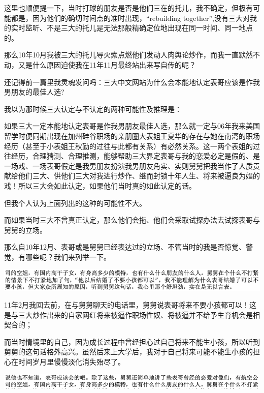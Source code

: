 \documentclass[9pt, b5paper]{article}
\begin{document}
这里也顺便提一下，当时打球的朋友是否是他们三在的托儿，我不确定，但极有可能都是，因为他们的确切时间点的准时出现，“rebuilding together”,没有三大对我的实时监听、不是三大的托儿是无法那般精确定位地出现在同一时间、同一地点的。 

那么10年10月我被三大的托儿导火索点燃他们发动人肉舆论炒作，而我一直默然不动，又是什么原因迫使我在11年11月最终站出来写自传的呢？

还记得前一篇里我灵魂发问吗：三大中文网站为什么会本能地认定表哥应该是作我男朋友的最佳人选?

我以为那时候三大认定与不认定的两种可能性及推理是：

如果三大一定本能地认定表哥是作我男朋友最佳人选，那么就一定与06年我来美国留学时便同期出现在加州硅谷职场的亲朋圈大表姐王夏华的存在与她在南湾的职场经历（甚至于小表姐王秋勤的过往与此都有关系）有必然关系。这一两个表姐的过往经历，合理猜测、合理推测，能够帮助三大界定表哥与我的恋爱必定是假的、是一场戏、一场表哥假定是我男朋友扮演我男朋友角实、实则舅舅把我当作了人质贡献给他们三大、供他们三大对我进行炒作、继而封锁十年人生、将来被逼良为娼的戏！所以三大会如此认定，如果他们当时真的如此认定的话。

但我个人认为上面列出的这种的可能性不大。

而如果当时三大不曾真正认定，那么他们会拖、他们会采取试探办法去试探表哥与舅舅的立场。

那么自10年12月、表哥或是舅舅已经表达过的立场、不管当时的我是否惊觉、警觉，有哪些呢？我们来列举一下。  

\begin{center}
\includegraphics[width=.9\linewidth]{./pic/backups_plans_20210412_170813.png}
\end{center}

11年2月我回去前，在与舅舅聊天的电话里，舅舅说表哥将来不要小孩都可以！这是与三大炒作出来的自家网红将来被逼作职场性奴、将被逼并不给予生育机会是相契合的；

而当时情境里的自己，因为成长过程中曾经担心过自己将来不能生小孩，所以听到舅舅的这句话格外高兴。虽然后来上大学后，我对于自己将来可能不能生小孩的担心在时间岁月里慢慢淡化消失殆尽了。 

\begin{center}
\includegraphics[width=.9\linewidth]{./pic/backups_plans_20210412_171125.png}
\end{center}
\end{document}

